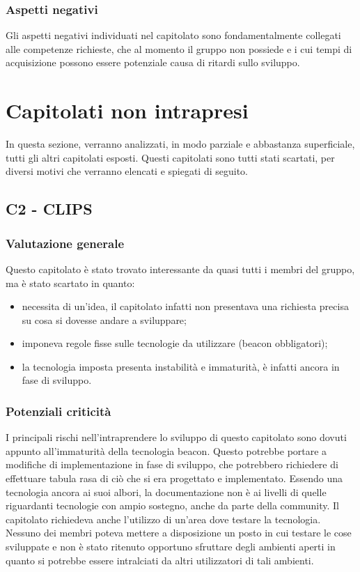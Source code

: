 \documentclass[a4paper]{article}
\begin{document}
			\subsubsection{Aspetti negativi}
				Gli aspetti negativi individuati nel capitolato sono fondamentalmente collegati alle competenze 
				richieste, che al momento il gruppo non possiede e i cui tempi di acquisizione possono essere
				potenziale causa di ritardi sullo sviluppo.
				
	\newpage
	\section{Capitolati non intrapresi}
		In questa sezione, verranno analizzati, in modo parziale e abbastanza superficiale, tutti gli altri capitolati esposti. Questi capitolati 
		sono tutti stati scartati, per diversi motivi che verranno elencati e spiegati di seguito.
		\subsection{C2 - CLIPS}
			\subsubsection{Valutazione generale}
				Questo capitolato è stato trovato interessante da quasi tutti i membri del gruppo, ma è stato scartato in quanto:
				\begin{itemize}
					\item necessita di un'idea, il capitolato infatti non presentava una richiesta precisa su cosa si dovesse andare 
					a sviluppare;
					\item imponeva regole fisse sulle tecnologie da utilizzare (beacon obbligatori);
					\item la tecnologia imposta presenta instabilità e immaturità, è infatti ancora in fase di sviluppo.
				\end{itemize}
			\subsubsection{Potenziali criticità}
				I principali rischi nell'intraprendere lo sviluppo di questo capitolato sono dovuti appunto all'immaturità della tecnologia beacon.
				Questo potrebbe portare a modifiche di implementazione in fase di sviluppo, che potrebbero richiedere di effettuare tabula rasa di ciò 
				che si era progettato e implementato. Essendo una tecnologia ancora ai suoi albori, la documentazione non è ai livelli di quelle 
				riguardanti tecnologie con ampio sostegno, anche da parte della community.
				Il capitolato richiedeva anche l'utilizzo di un'area dove testare la tecnologia. Nessuno dei membri poteva mettere a disposizione 
				un posto in cui testare le cose sviluppate e non è stato ritenuto opportuno sfruttare degli ambienti aperti in quanto si potrebbe 
				essere intralciati da altri utilizzatori di tali ambienti.
				
\end{document}
